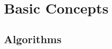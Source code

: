 \documentclass[../jaynes_prob_theory_notes.tex]{subfiles}
\begin{document}
\section{Basic Concepts}
    \subsection{Algorithms}
\end{document}
